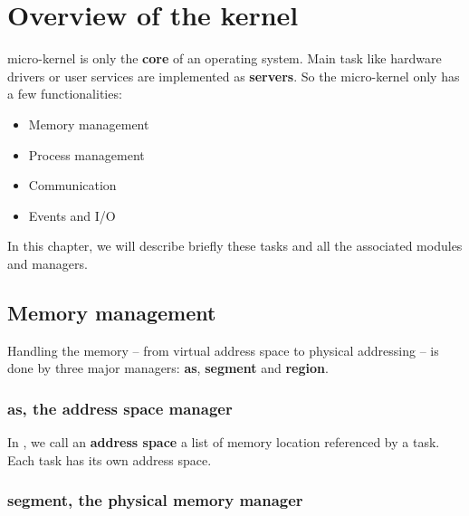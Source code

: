 
%
%

\chapter{Overview of the kernel}

\newpage

\kaneton  micro-kernel  is  only  the \textbf{core}  of  an  operating
system.  Main  task  like   hardware  drivers  or  user  services  are
implemented as  \textbf{servers}. So the  micro-kernel only has  a few
functionalities:\\

\begin{itemize}
\item Memory management
\item Process management
\item Communication
\item Events and I/O
\end{itemize}

In  this chapter, we  will describe  briefly these  tasks and  all the
associated modules and managers.

\section{Memory management}

Handling  the  memory  --  from  virtual  address  space  to  physical
addressing  --   is  done   by  three  major   managers:  \textbf{as},
\textbf{segment} and \textbf{region}.

\subsection*{as, the address space manager}

In  \kaneton, we  call  an  \textbf{address space}  a  list of  memory
location referenced by a task. Each task has its own address space.

\subsection*{segment, the physical memory manager}

